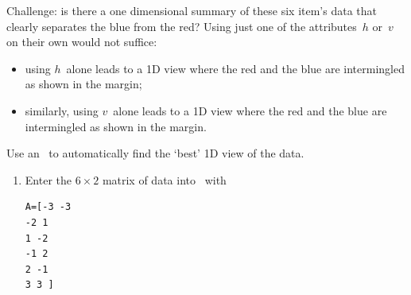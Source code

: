 \begin{example}
Challenge: is there a one dimensional summary of these six item's data that clearly separates the blue from the red?
Using just one of the attributes~\(h\) or~\(v\) on their own would not suffice:
%
\begin{itemize}
\item using \(h\)~alone leads to a 1D view where the red and the blue are intermingled as shown in the margin;
%
\item similarly, using \(v\)~alone leads to a 1D view where the red and the blue are intermingled as shown in the margin.
\end{itemize}

\begin{solution} 
Use an \svd\ to automatically find the `best' 1D view of the data.
\begin{enumerate}
\item Enter the \(6\times2\) matrix of data into \script\ with
\begin{verbatim}
A=[-3 -3
-2 1
1 -2
-1 2
2 -1
3 3 ]
\end{verbatim}
\setbox\ajrqrbox\hbox{}%
\marginajrbox%


\end{enumerate}
\end{solution}
\end{example}
